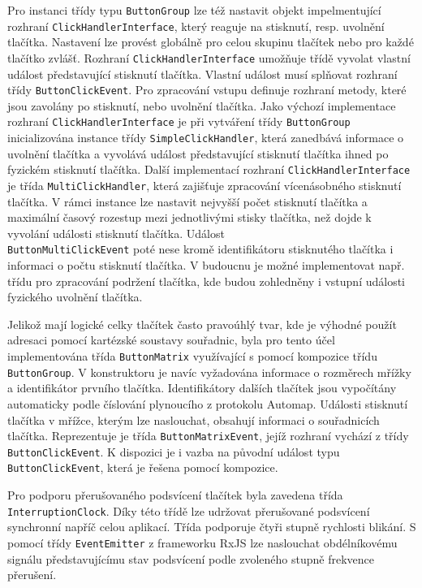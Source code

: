 \documentclass[thesis=M,czech]{FITthesis}[2019/03/06]
\begin{document}
		Pro instanci třídy typu \texttt{ButtonGroup} lze též nastavit objekt impelmentující rozhraní \texttt{ClickHandlerInterface}, který reaguje
		na stisknutí, resp. uvolnění tlačítka. Nastavení lze provést globálně pro celou skupinu tlačítek nebo pro každé tlačítko zvlášť.
		Rozhraní \texttt{ClickHandlerInterface} umožňuje třídě vyvolat vlastní událost představující stisknutí tlačítka.
		Vlastní událost musí splňovat rozhraní třídy \texttt{ButtonClickEvent}. Pro zpracování vstupu definuje rozhraní metody,	které jsou zavolány po stisknutí, nebo uvolnění tlačítka.
		Jako výchozí implementace rozhraní \texttt{ClickHandlerInterface} je při vytváření třídy \texttt{ButtonGroup} inicializována instance třídy 
		\texttt{SimpleClickHandler}, která zanedbává informace o uvolnění tlačítka a vyvolává událost představující stisknutí tlačítka 
		ihned po fyzickém stisknutí tlačítka. 
		Další implementací rozhraní \texttt{ClickHandlerInterface} je třída \texttt{MultiClickHandler}, která zajišťuje zpracování vícenásobného stisknutí tlačítka. 
		V rámci instance lze nastavit nejvyšší počet stisknutí tlačítka a maximální časový rozestup mezi jednotlivými stisky tlačítka, než dojde k vyvolání události stisknutí tlačítka. 
		Událost \\\texttt{ButtonMultiClickEvent} poté nese kromě identifikátoru stisknutého tlačítka i informaci o počtu stisknutí tlačítka.
		V budoucnu je možné implementovat např. třídu pro zpracování podržení tlačítka, kde budou zohledněny i vstupní události fyzického uvolnění tlačítka.
		
		Jelikož mají logické celky tlačítek často pravoúhlý tvar, kde je výhodné použít adresaci pomocí
		kartézské soustavy souřadnic, byla pro tento účel implementována třída \texttt{ButtonMatrix} využívající
		s pomocí kompozice třídu \texttt{ButtonGroup}. V konstruktoru je navíc vyžadována informace o rozměrech mřížky a identifikátor prvního tlačítka. 
		Identifikátory dalších tlačítek jsou vypočítány automaticky podle číslování plynoucího z protokolu Automap.
		Události stisknutí tlačítka v mřížce, kterým lze naslouchat, obsahují informaci o souřadnicích tlačítka. Reprezentuje je třída \texttt{ButtonMatrixEvent},
		jejíž rozhraní vychází z třídy \texttt{ButtonClickEvent}. K dispozici je i vazba na původní událost typu \texttt{ButtonClickEvent}, která je řešena pomocí kompozice.
		
		Pro podporu přerušovaného podsvícení tlačítek byla zavedena třída \\\texttt{InterruptionClock}. Díky této třídě lze 
		udržovat přerušované podsvícení synchronní napříč celou aplikací. Třída podporuje čtyři stupně rychlosti blikání.
		S pomocí třídy \texttt{EventEmitter} z frameworku RxJS lze naslouchat obdélníkovému signálu představujícímu stav podsvícení podle zvoleného stupně frekvence přerušení.
\end{document}
